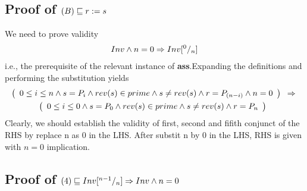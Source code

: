 \documentclass[headings=small,a4paper,12pt]{scrartcl}
\begin{document}
\subsection{Proof of $(B)\sqsubseteq r \mathrel{:=} {s}$}
\label{sec:proofBass}
We need to prove validity
\begin{gather*}
	Inv \wedge n=0 \Rightarrow Inv[^{0}/_{n}]
\end{gather*}
i.e., the prerequisite of the relevant instance of \textbf{ass}.Expanding the definitions and performing the substitution yields
\begin{gather*}
	\left(
	\begin{array}{l}
		0\leq i\leq n\wedge s=P_i\wedge rev(s)\in prime \wedge s\neq rev(s)\wedge r=P_{(n-i)} \wedge n=0 
	\end{array}
	\right)\enskip
	\Rightarrow{}\\
	\left(
	\begin{array}{l}
		0\leq i\leq 0 \wedge s=P_0\wedge rev(s)\in prime \wedge s\neq rev(s)\wedge r=P_n 
	\end{array}
	\right)\enskip
\end{gather*}
Clearly, we should establish the validity of first, second and fifith conjunct of the RHS by replace n as 0 in the LHS. After substit n by 0 in the LHS, RHS is given with $n = 0$ implication.

\subsection{Proof of $(4)\sqsubseteq Inv[^{n-1}/_{n}]\Rightarrow Inv\wedge n=0$}
\label{sec:proof4s-post}
\end{document}
